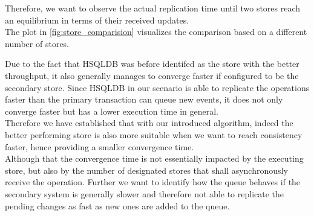Therefore, we want to observe the actual replication time until two stores reach an equilibrium in terms of their received updates.\\
The plot in \ref{fig:store_comparision} visualizes the comparison based on a different number of stores.

Due to the fact that HSQLDB was before identifed as the store with the better throughput, 
it also generally manages to converge faster if configured to be the secondary store. 
Since HSQLDB in our scenario is able to replicate the operations faster than the primary transaction can queue new events,
it does not only converge faster but has a lower execution time in general.\\
Therefore we have established that with our introduced algorithm, indeed
the better performing store is also more suitable when we want to reach consistency faster, hence providing a smaller convergence time.\\




Although that the convergence time is not essentially impacted by the executing store, but also by the number of designated stores that shall asynchronously 
receive the operation. 
Further we want to identify how the queue behaves if the secondary system is generally slower and therefore not able to replicate 
the pending changes as fast as new ones are added to the queue.



